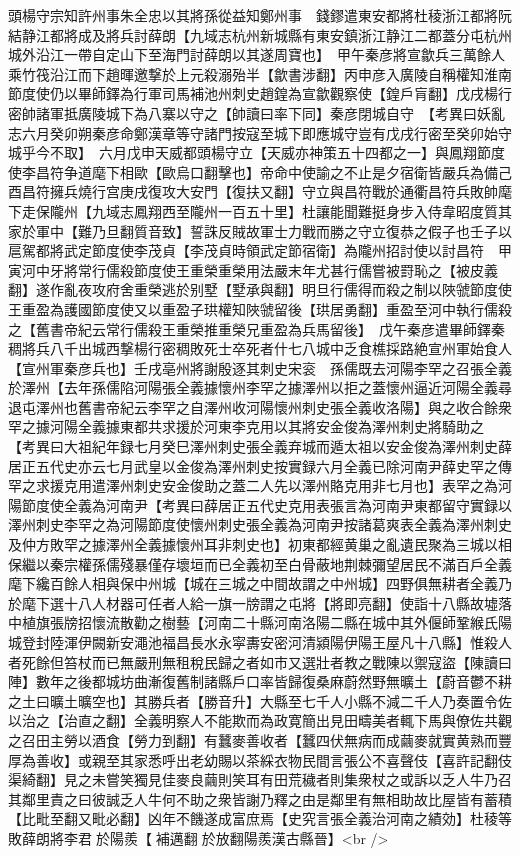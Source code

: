 頭楊守宗知許州事朱全忠以其將孫從益知鄭州事　錢鏐遣東安都將杜稜浙江都將阮結静江都將成及將兵討薛朗【九域志杭州新城縣有東安鎮浙江静江二都蓋分屯杭州城外沿江一帶自定山下至海門討薛朗以其遂周寶也】　甲午秦彦將宣歙兵三萬餘人乘竹筏沿江而下趙暉邀撃於上元殺溺殆半【歙書涉翻】丙申彦入廣陵自稱權知淮南節度使仍以畢師鐸為行軍司馬補池州刺史趙鍠為宣歙觀察使【鍠戶肓翻】戊戌楊行密帥諸軍抵廣陵城下為八寨以守之【帥讀曰率下同】秦彦閉城自守　【考異曰妖亂志六月癸卯朔秦彦命鄭漢章等守諸門按寇至城下即應城守豈有戊戌行密至癸卯始守城乎今不取】　六月戊申天威都頭楊守立【天威亦神策五十四都之一】與鳳翔節度使李昌符争道麾下相歐【歐烏口翻擊也】帝命中使諭之不止是夕宿衛皆嚴兵為備己酉昌符擁兵燒行宫庚戌復攻大安門【復扶又翻】守立與昌符戰於通衢昌符兵敗帥麾下走保隴州【九域志鳳翔西至隴州一百五十里】杜讓能聞難挺身步入侍韋昭度質其家於軍中【難乃旦翻質音致】誓誅反賊故軍士力戰而勝之守立復恭之假子也壬子以扈駕都將武定節度使李茂貞【李茂貞時領武定節宿衛】為隴州招討使以討昌符　甲寅河中牙將常行儒殺節度使王重榮重榮用法嚴末年尤甚行儒嘗被罸恥之【被皮義翻】遂作亂夜攻府舍重榮逃於别墅【墅承與翻】明旦行儒得而殺之制以陜虢節度使王重盈為護國節度使又以重盈子珙權知陜虢留後【珙居勇翻】重盈至河中執行儒殺之【舊書帝紀云常行儒殺王重榮推重榮兄重盈為兵馬留後】　戊午秦彦遣畢師鐸秦稠將兵八千出城西撃楊行密稠敗死士卒死者什七八城中乏食樵採路絶宣州軍始食人【宣州軍秦彦兵也】壬戌亳州將謝殷逐其刺史宋衮　孫儒既去河陽李罕之召張全義於澤州【去年孫儒陷河陽張全義據懷州李罕之據澤州以拒之蓋懷州逼近河陽全義尋退屯澤州也舊書帝紀云李罕之自澤州收河陽懷州刺史張全義收洛陽】與之收合餘衆罕之據河陽全義據東都共求援於河東李克用以其將安金俊為澤州刺史將騎助之　【考異曰大祖紀年録七月癸巳澤州刺史張全義弃城而遁太祖以安金俊為澤州刺史薛居正五代史亦云七月武皇以金俊為澤州刺史按實録六月全義已除河南尹薛史罕之傳罕之求援克用遣澤州刺史安金俊助之蓋二人先以澤州賂克用非七月也】表罕之為河陽節度使全義為河南尹【考異曰薛居正五代史克用表張言為河南尹東都留守實録以澤州刺史李罕之為河陽節度使懷州刺史張全義為河南尹按諸葛爽表全義為澤州刺史及仲方敗罕之據澤州全義據懷州耳非刺史也】初東都經黄巢之亂遺民聚為三城以相保繼以秦宗權孫儒殘暴僅存壞垣而已全義初至白骨蔽地荆棘彌望居民不滿百戶全義麾下纔百餘人相與保中州城【城在三城之中間故謂之中州城】四野俱無耕者全義乃於麾下選十八人材器可任者人給一旗一牓謂之屯將【將即亮翻】使詣十八縣故墟落中植旗張牓招懷流散勸之樹藝【河南二十縣河南洛陽二縣在城中其外偃師鞏緱氏陽城登封陸渾伊闕新安澠池福昌長水永寜夀安密河清潁陽伊陽王屋凡十八縣】惟殺人者死餘但笞杖而已無嚴刑無租稅民歸之者如市又選壯者教之戰陳以禦寇盜【陳讀曰陣】數年之後都城坊曲漸復舊制諸縣戶口率皆歸復桑麻蔚然野無曠土【蔚音鬱不耕之土曰曠土曠空也】其勝兵者【勝音升】大縣至七千人小縣不減二千人乃奏置令佐以治之【治直之翻】全義明察人不能欺而為政寛簡出見田疇美者輒下馬與僚佐共觀之召田主勞以酒食【勞力到翻】有蠶麥善收者【蠶四伏無病而成繭麥就實黄熟而豐厚為善收】或親至其家悉呼出老幼賜以茶綵衣物民間言張公不喜聲伎【喜許記翻伎渠綺翻】見之未嘗笑獨見佳麥良繭則笑耳有田荒穢者則集衆杖之或訴以乏人牛乃召其鄰里責之曰彼誠乏人牛何不助之衆皆謝乃釋之由是鄰里有無相助故比屋皆有蓄積【比毗至翻又毗必翻】凶年不饑遂成富庶焉【史究言張全義治河南之績効】杜稜等敗薛朗將李君於陽羨【補邁翻於放翻陽羨漢古縣晉】<br />
